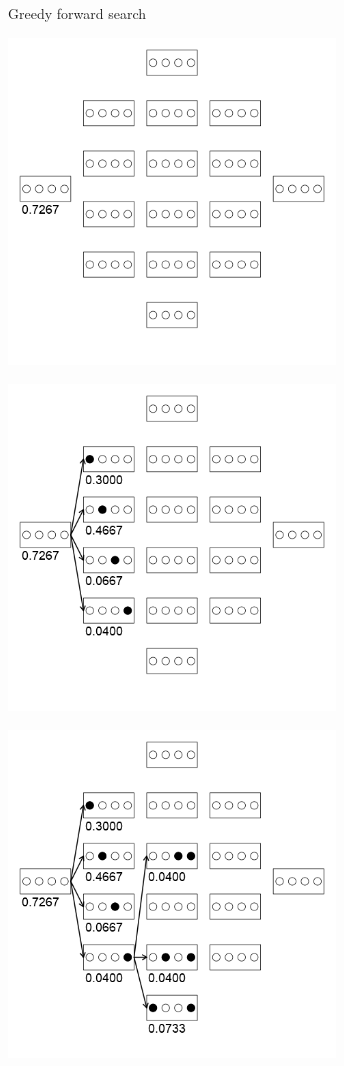 \documentclass[11pt,compress,t,notes=noshow, xcolor=table]{beamer}
\begin{document}
\begin{vbframe}{Greedy forward search}
    \begin{center}
    \includegraphics[width = 0.65\textwidth]{figure_man/wrapperanim2.png}
    \end{center}

    \framebreak

    \begin{center}
    \includegraphics[width = 0.65\textwidth]{figure_man/wrapperanim3.png}
    \end{center}

    \framebreak

    \begin{center}
    \includegraphics[width = 0.65\textwidth]{figure_man/wrapperanim4.png}
    \end{center}


\end{vbframe}
\end{document}
